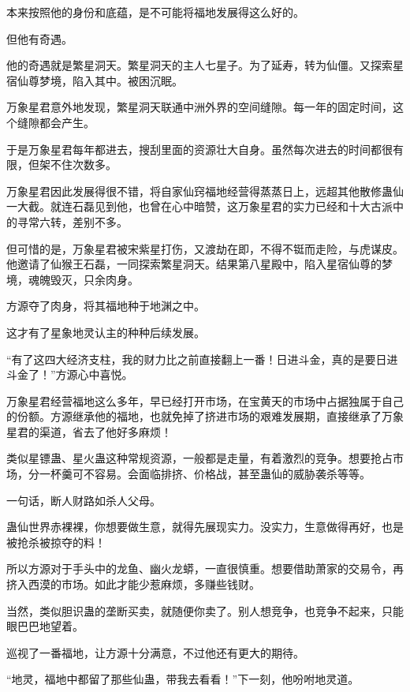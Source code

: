 \begin{this_body}
本来按照他的身份和底蕴，是不可能将福地发展得这么好的。

但他有奇遇。

他的奇遇就是繁星洞天。繁星洞天的主人七星子。为了延寿，转为仙僵。又探索星宿仙尊梦境，陷入其中。被困沉眠。

万象星君意外地发现，繁星洞天联通中洲外界的空间缝隙。每一年的固定时间，这个缝隙都会产生。

于是万象星君每年都进去，搜刮里面的资源壮大自身。虽然每次进去的时间都很有限，但架不住次数多。

万象星君因此发展得很不错，将自家仙窍福地经营得蒸蒸日上，远超其他散修蛊仙一大截。就连石磊见到他，也曾在心中暗赞，这万象星君的实力已经和十大古派中的寻常六转，差别不多。

但可惜的是，万象星君被宋紫星打伤，又渡劫在即，不得不铤而走险，与虎谋皮。他邀请了仙猴王石磊，一同探索繁星洞天。结果第八星殿中，陷入星宿仙尊的梦境，魂魄毁灭，只余肉身。

方源夺了肉身，将其福地种于地渊之中。

这才有了星象地灵认主的种种后续发展。

“有了这四大经济支柱，我的财力比之前直接翻上一番！日进斗金，真的是要日进斗金了！”方源心中喜悦。

万象星君经营福地这么多年，早已经打开市场，在宝黄天的市场中占据独属于自己的份额。方源继承他的福地，也就免掉了挤进市场的艰难发展期，直接继承了万象星君的渠道，省去了他好多麻烦！

类似星镖蛊、星火蛊这种常规资源，一般都是走量，有着激烈的竞争。想要抢占市场，分一杯羹可不容易。会面临排挤、价格战，甚至蛊仙的威胁袭杀等等。

一句话，断人财路如杀人父母。

蛊仙世界赤裸裸，你想要做生意，就得先展现实力。没实力，生意做得再好，也是被抢杀被掠夺的料！

所以方源对于手头中的龙鱼、幽火龙蟒，一直很慎重。想要借助萧家的交易令，再挤入西漠的市场。如此才能少惹麻烦，多赚些钱财。

当然，类似胆识蛊的垄断买卖，就随便你卖了。别人想竞争，也竞争不起来，只能眼巴巴地望着。

巡视了一番福地，让方源十分满意，不过他还有更大的期待。

“地灵，福地中都留了那些仙蛊，带我去看看！”下一刻，他吩咐地灵道。

\end{this_body}


